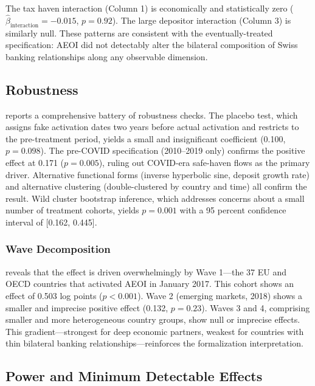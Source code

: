 \documentclass[12pt]{article}
\begin{document}
The tax haven interaction (Column 1) is economically and statistically zero ($\hat{\beta}_{\text{interaction}} = -0.015$, $p = 0.92$). The large depositor interaction (Column 3) is similarly null. These patterns are consistent with the eventually-treated specification: AEOI did not detectably alter the bilateral composition of Swiss banking relationships along any observable dimension.

\subsection{Robustness}



 reports a comprehensive battery of robustness checks. The placebo test, which assigns fake activation dates two years before actual activation and restricts to the pre-treatment period, yields a small and insignificant coefficient (0.100, $p = 0.098$). The pre-COVID specification (2010--2019 only) confirms the positive effect at 0.171 ($p = 0.005$), ruling out COVID-era safe-haven flows as the primary driver. Alternative functional forms (inverse hyperbolic sine, deposit growth rate) and alternative clustering (double-clustered by country and time) all confirm the result. Wild cluster bootstrap inference, which addresses concerns about a small number of treatment cohorts, yields $p = 0.001$ with a 95 percent confidence interval of [0.162, 0.445].

\subsubsection*{Wave Decomposition}  reveals that the effect is driven overwhelmingly by Wave 1---the 37 EU and OECD countries that activated AEOI in January 2017. This cohort shows an effect of 0.503 log points ($p < 0.001$). Wave 2 (emerging markets, 2018) shows a smaller and imprecise positive effect (0.132, $p = 0.23$). Waves 3 and 4, comprising smaller and more heterogeneous country groups, show null or imprecise effects. This gradient---strongest for deep economic partners, weakest for countries with thin bilateral banking relationships---reinforces the formalization interpretation.



\subsection{Power and Minimum Detectable Effects}
\end{document}
